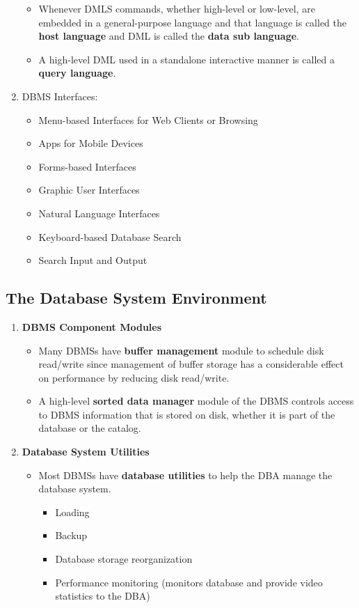 \documentclass[10pt]{article}
\begin{document}
\begin{enumerate}
\begin{itemize}
		\item Whenever DMLS commands, whether high-level or low-level, are embedded in a general-purpose language and that language is called the \textbf{host language} and DML is called the \textbf{data sub language}.
		\item A high-level DML used in a standalone interactive manner is called a \textbf{query language}.
	\end{itemize}

	\item DBMS Interfaces:
	\begin{itemize}
		\item Menu-based Interfaces for Web Clients or Browsing
		\item Apps for Mobile Devices
		\item Forms-based Interfaces
		\item Graphic User Interfaces
		\item Natural Language Interfaces
		\item Keyboard-based Database Search
		\item Search Input and Output
	\end{itemize}
\end{enumerate}

\subsection{The Database System Environment}
\begin{enumerate}
	\item \textbf{DBMS Component Modules}
	\begin{itemize}
		\item Many DBMSs have \textbf{buffer management} module to schedule disk read/write since management of buffer storage has a considerable effect on performance by reducing disk read/write.
		\item A high-level \textbf{sorted data manager} module of the DBMS controls access to DBMS information that is stored on disk, whether it is part of the database or the catalog.
	\end{itemize}

	\item \textbf{Database System Utilities}
	\begin{itemize}
		\item Most DBMSs have \textbf{database utilities} to help the DBA manage the database system.
		\begin{itemize}
			\item Loading
			\item Backup
			\item Database storage reorganization
			\item Performance monitoring (monitors database and provide video statistics to the DBA)
		\end{itemize} 
	\end{itemize}
\end{enumerate}
\end{document}
